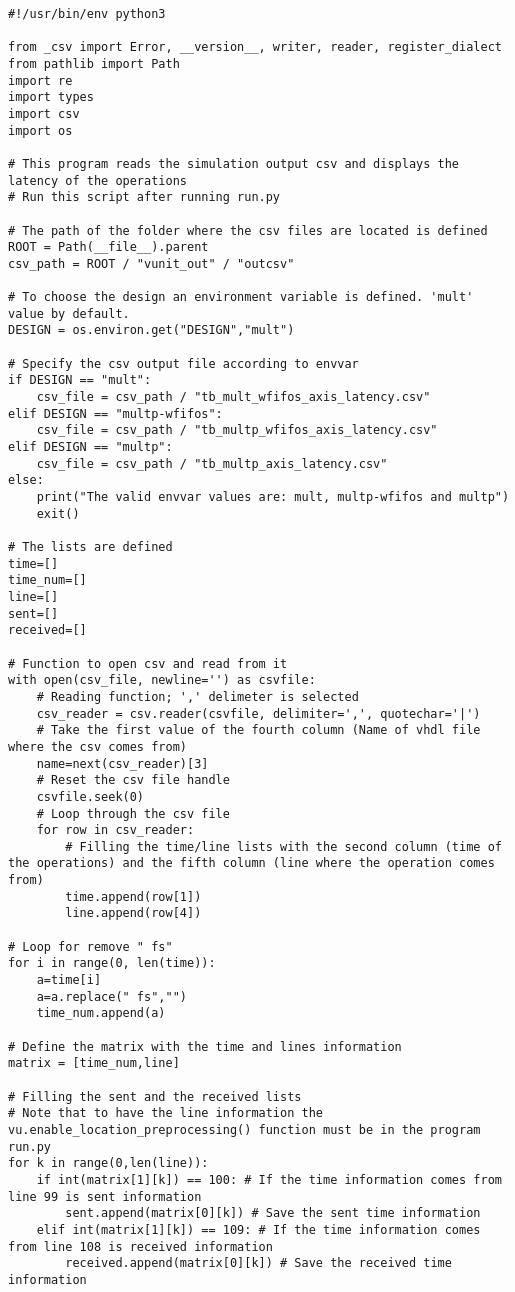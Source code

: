\begin{code}
\begin{verbatim}
#!/usr/bin/env python3

from _csv import Error, __version__, writer, reader, register_dialect
from pathlib import Path
import re
import types
import csv
import os

# This program reads the simulation output csv and displays the latency of the operations
# Run this script after running run.py

# The path of the folder where the csv files are located is defined
ROOT = Path(__file__).parent
csv_path = ROOT / "vunit_out" / "outcsv"

# To choose the design an environment variable is defined. 'mult' value by default.
DESIGN = os.environ.get("DESIGN","mult")

# Specify the csv output file according to envvar
if DESIGN == "mult":
    csv_file = csv_path / "tb_mult_wfifos_axis_latency.csv"
elif DESIGN == "multp-wfifos":
    csv_file = csv_path / "tb_multp_wfifos_axis_latency.csv"
elif DESIGN == "multp":
    csv_file = csv_path / "tb_multp_axis_latency.csv"
else:
    print("The valid envvar values are: mult, multp-wfifos and multp")
    exit()

# The lists are defined
time=[]
time_num=[]
line=[]
sent=[]
received=[]

# Function to open csv and read from it
with open(csv_file, newline='') as csvfile:
    # Reading function; ',' delimeter is selected
    csv_reader = csv.reader(csvfile, delimiter=',', quotechar='|')
    # Take the first value of the fourth column (Name of vhdl file where the csv comes from)    
    name=next(csv_reader)[3]
    # Reset the csv file handle
    csvfile.seek(0)
    # Loop through the csv file 
    for row in csv_reader:
        # Filling the time/line lists with the second column (time of the operations) and the fifth column (line where the operation comes from)
        time.append(row[1])
        line.append(row[4])

# Loop for remove " fs"
for i in range(0, len(time)):
    a=time[i]
    a=a.replace(" fs","")
    time_num.append(a)

# Define the matrix with the time and lines information
matrix = [time_num,line]

# Filling the sent and the received lists
# Note that to have the line information the vu.enable_location_preprocessing() function must be in the program run.py
for k in range(0,len(line)):
    if int(matrix[1][k]) == 100: # If the time information comes from line 99 is sent information
        sent.append(matrix[0][k]) # Save the sent time information
    elif int(matrix[1][k]) == 109: # If the time information comes from line 108 is received information
        received.append(matrix[0][k]) # Save the received time information


\end{verbatim}
\end{code}

